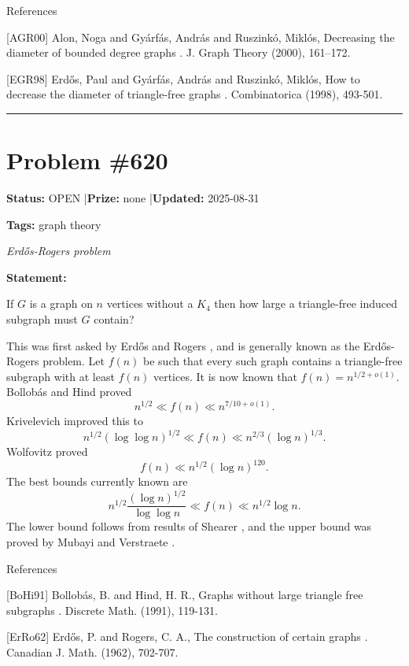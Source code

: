 \documentclass{article}
\begin{document}
References

[AGR00] Alon, Noga and Gy\'{a}rf\'{a}s, Andr\'{a}s and Ruszink\'{o}, Mikl\'{o}s, Decreasing the diameter of bounded degree graphs . J. Graph Theory (2000), 161--172.

[EGR98] Erd\H{o}s, Paul and Gy\'{a}rf\'{a}s, Andr\'{a}s and Ruszink\'{o}, Mikl\'{o}s, How to decrease the diameter of triangle-free graphs . Combinatorica (1998), 493-501.

\noindent\rule{\linewidth}{0.4pt}


\section{Problem \#620}
\label{prob:620}

\noindent\textbf{Status:} OPEN \quad|\quad \textbf{Prize:} none \quad|\quad \textbf{Updated:} 2025-08-31

\noindent\textbf{Tags:} graph theory

\medskip
\noindent\textit{Erdős-Rogers problem}


\noindent\textbf{Statement:}

If $G$ is a graph on $n$ vertices without a $K_4$ then how large a triangle-free induced subgraph must $G$ contain?




This was first asked by Erd\H{o}s and Rogers \cite{ErRo62}, and is generally known as the Erd\H{o}s-Rogers problem. Let $f(n)$ be such that every such graph contains a triangle-free subgraph with at least $f(n)$ vertices. It is now known that $f(n)=n^{1/2+o(1)}$. Bollob\'{a}s and Hind \cite{BoHi91} proved\[n^{1/2} \ll f(n) \ll n^{7/10+o(1)}.\]Krivelevich \cite{Kr94} improved this to\[n^{1/2}(\log\log n)^{1/2} \ll f(n) \ll n^{2/3}(\log n)^{1/3}.\]Wolfovitz \cite{Wo13} proved\[f(n) \ll n^{1/2}(\log n)^{120}.\]The best bounds currently known are\[n^{1/2}\frac{(\log n)^{1/2}}{\log\log n}\ll f(n) \ll n^{1/2}\log n.\]The lower bound follows from results of Shearer \cite{Sh95}, and the upper bound was proved by Mubayi and Verstraete \cite{MuVe24}.




References

[BoHi91] Bollob\'{a}s, B. and Hind, H. R., Graphs without large triangle free subgraphs . Discrete Math. (1991), 119-131.

[ErRo62] Erd\H{o}s, P. and Rogers, C. A., The construction of certain graphs . Canadian J. Math. (1962), 702-707.
\end{document}
